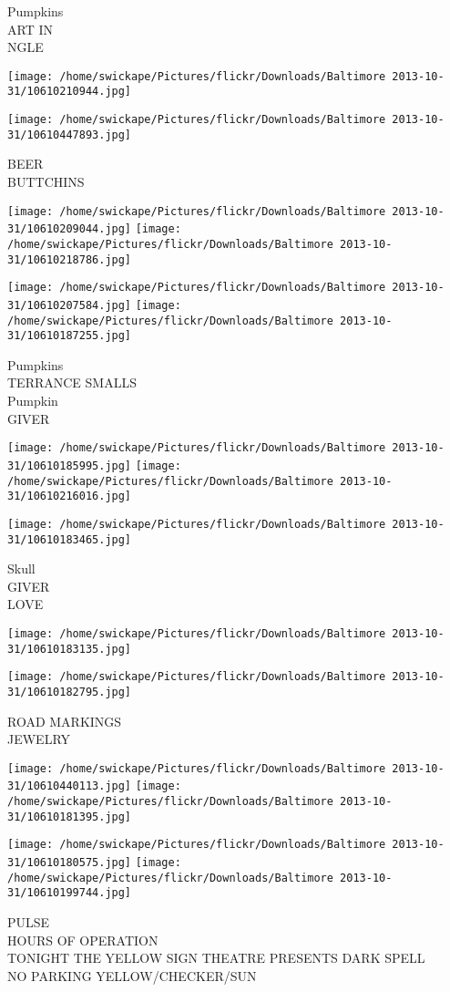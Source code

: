 \documentclass[10pt,letterpaper]{article}
\begin{document}
Pumpkins\\
ART IN\\
NGLE
\pagebreak

\texttt{[image: /home/swickape/Pictures/flickr/Downloads/Baltimore 2013-10-31/10610210944.jpg]}

\vspace{0.25in}
\texttt{[image: /home/swickape/Pictures/flickr/Downloads/Baltimore 2013-10-31/10610447893.jpg]}

BEER\\
BUTTCHINS
\pagebreak

\texttt{[image: /home/swickape/Pictures/flickr/Downloads/Baltimore 2013-10-31/10610209044.jpg]}
\texttt{[image: /home/swickape/Pictures/flickr/Downloads/Baltimore 2013-10-31/10610218786.jpg]}

\texttt{[image: /home/swickape/Pictures/flickr/Downloads/Baltimore 2013-10-31/10610207584.jpg]}
\texttt{[image: /home/swickape/Pictures/flickr/Downloads/Baltimore 2013-10-31/10610187255.jpg]}

Pumpkins\\
TERRANCE SMALLS\\
Pumpkin\\
GIVER
\pagebreak

\texttt{[image: /home/swickape/Pictures/flickr/Downloads/Baltimore 2013-10-31/10610185995.jpg]}
\texttt{[image: /home/swickape/Pictures/flickr/Downloads/Baltimore 2013-10-31/10610216016.jpg]}

\texttt{[image: /home/swickape/Pictures/flickr/Downloads/Baltimore 2013-10-31/10610183465.jpg]}

Skull\\
GIVER\\
LOVE
\pagebreak

\texttt{[image: /home/swickape/Pictures/flickr/Downloads/Baltimore 2013-10-31/10610183135.jpg]}

\vspace{0.25in}
\texttt{[image: /home/swickape/Pictures/flickr/Downloads/Baltimore 2013-10-31/10610182795.jpg]}

ROAD MARKINGS\\
JEWELRY
\pagebreak

\texttt{[image: /home/swickape/Pictures/flickr/Downloads/Baltimore 2013-10-31/10610440113.jpg]}
\texttt{[image: /home/swickape/Pictures/flickr/Downloads/Baltimore 2013-10-31/10610181395.jpg]}

\texttt{[image: /home/swickape/Pictures/flickr/Downloads/Baltimore 2013-10-31/10610180575.jpg]}
\texttt{[image: /home/swickape/Pictures/flickr/Downloads/Baltimore 2013-10-31/10610199744.jpg]}

PULSE\\
HOURS OF OPERATION\\
TONIGHT THE YELLOW SIGN THEATRE PRESENTS DARK SPELL\\
NO PARKING YELLOW/CHECKER/SUN
\pagebreak
\end{document}
